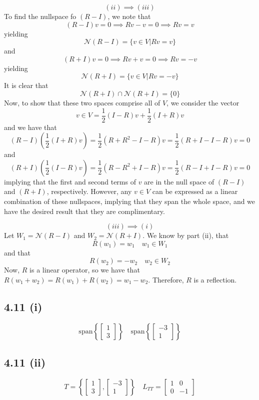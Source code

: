 \documentclass[letterpaper,12pt]{article}
\theoremstyle{definition}
\begin{document}
\[(ii) \implies (iii)\]
To find the nullspace fo $(R-I)$, we note that
\[ (R-I)v = 0 \implies Rv - v = 0 \implies Rv = v \]
yielding
\[ \mathscr{N}(R - I) = \{v \in V | Rv = v \} \]
and 
\[ (R+I)v = 0 \implies Rv + v = 0 \implies Rv = -v \]
yielding
\[ \mathscr{N}(R + I) = \{v \in V | Rv = -v \} \]
It is clear that 
\[ \mathscr{N}(R + I) \cap
\mathscr{N}(R + I) = \{ 0\}\]
Now, to show that these two spaces comprise all of $V$, we consider the vector 
\[v\in V = \frac{1}{2}(I-R)v +  \frac{1}{2}(I+R)v\]
and we have that 
\[(R-I) (\frac{1}{2} (I + R)v) = \frac{1}{2}(R + R^2 - I - R)v =\frac{1}{2}(R + I - I - R)v = 0\]
and
\[(R+I) (\frac{1}{2} (I - R)v) = \frac{1}{2}(R - R^2 + I - R)v =\frac{1}{2}(R - I + I - R)v = 0\]
implying that the first and second terms of $v$ are in the null space of $(R-I)$ and $(R+I)$, respectively. However, any $v\in V$ can be expressed as a linear combination of these nullspaces, implying that they span the whole space, and we have the desired result that they are complimentary.


\[(iii) \implies (i)\]
Let $W_1 = \mathscr{N}(R-I)$ and $W_2 = \mathscr{N}(R+I)$. We know by part (ii), that 
\[R(w_1) = w_1 \quad w_1 \in W_1\] and that 
\[R(w_2) = -w_2 \quad w_2 \in W_2\] 
Now, $R$ is a linear operator, so we have that $R(w_1 + w_2) = R(w_1) + R(w_2)= w_1 - w_2$. Therefore, $R$ is a reflection.



\subsection*{4.11 (i)}
\[ \text{span} \left\{ \begin{bmatrix} 1 \\ 3 \end{bmatrix} \right\} \quad \text{span} \left\{ \begin{bmatrix} -3 \\ 1 \end{bmatrix} \right\} \]


\subsection*{4.11 (ii)}

\[ T = \left\{ \begin{bmatrix} 1 \\ 3 \end{bmatrix}, \begin{bmatrix} -3 \\ 1 \end{bmatrix} \right\} 
\quad
L_{TT} = \begin{bmatrix} 1 & 0 \\ 0 & -1 \end{bmatrix}
\] 
\end{document}
